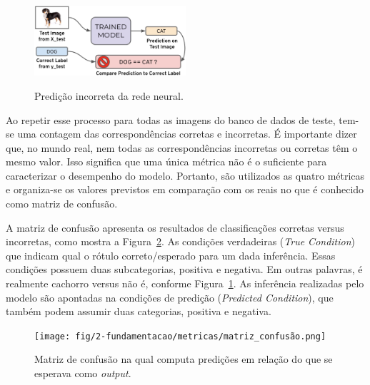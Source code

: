             \begin{figure}[H]
                \centering
                \caption{Predição incorreta da rede neural.}
                \includegraphics[width=0.5\textwidth]{fig/2-fundamentacao/metricas/gato_nao_igualcao.png}
                \label{fig:gato_nao_igual_cao}
            \end{figure}
            
            Ao repetir esse processo para todas as imagens do banco de dados de teste, tem-se uma contagem das correspondências corretas e incorretas. É importante dizer que, no mundo real, nem todas as correspondências incorretas ou corretas têm o mesmo valor. Isso significa que uma única métrica não é o suficiente para caracterizar o desempenho do modelo. Portanto, são utilizados as quatro métricas e organiza-se os valores previstos em comparação com os reais no que é conhecido como matriz de confusão.
            
            A matriz de confusão apresenta os resultados de classificações corretas versus incorretas, como mostra a Figura~\ref{fig:matriz_confusão}. As condições verdadeiras (\textit{True Condition}) que indicam qual o rótulo correto/esperado para um dada inferência. Essas condições possuem duas subcategorias, positiva e negativa. Em outras palavras, é realmente cachorro versus não é, conforme Figura~\ref{fig:gato_nao_igual_cao}. As inferência realizadas pelo modelo são apontadas na condições de predição (\textit{Predicted Condition}), que também podem assumir duas categorias, positiva e negativa.
        
            \begin{figure}[H]
                \centering
                \caption{Matriz de confusão na qual computa predições em relação do que se esperava como \textit{output}.}
                \texttt{[image: fig/2-fundamentacao/metricas/matriz\_confusão.png]}
                \label{fig:matriz_confusão}
            \end{figure}
            
